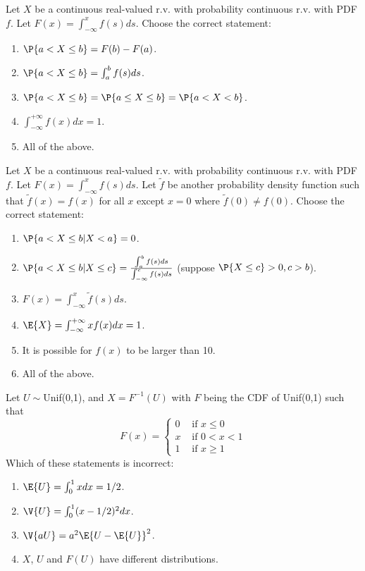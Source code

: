 \documentclass[poll_tutorial_format]{subfiles}
\begin{document}
	

	\begin{exercise}
		Let $X$ be a continuous real-valued r.v. with probability continuous r.v. with PDF $f$. Let $F(x)=\int_{-\infty}^x f(s)ds$. 
		Choose the correct statement:
		\begin{enumerate}
			\item $\P{a< X\leq b} =F(b)-F(a)$.
			\item $\P{a< X\leq b} =\int_{a}^b f(s)ds$.
			\item $\P{a< X\leq b}=\P{a\leq  X\leq b}=\P{a< X< b}$.
			\item $\int_{-\infty}^{+\infty} f(x)dx=1$.
			\item All of the above. 
		\end{enumerate}
	\end{exercise}
	
	
	
	\begin{exercise}
	Let $X$ be a continuous real-valued r.v. with probability continuous r.v. with PDF $f$. Let $F(x)=\int_{-\infty}^x f(s)ds$. Let $\tilde{f}$ be another probability density function such that  $\tilde{f}(x)=f(x)$ for all $x$ except $x=0$ where $\tilde{f}(0)\neq {f}(0)$.
	Choose the correct statement:
	\begin{enumerate}
		\item $\P{a< X\leq b|X<a} =0$.
		\item $\P{a< X\leq b|X\leq c} =\frac{\int_{a}^b f(s)ds}{\int_{-\infty}^c f(s)ds}$ (suppose $\P{X\leq c} >0, c>b$).
		\item $F(x)=\int_{-\infty}^x \tilde{f}(s)ds$.
		\item $\E{X}= \int_{-\infty}^{+\infty} xf(x)dx=1$.
		\item It is possible for $f(x)$ to be larger than 10.
		\item All of the above. 
	\end{enumerate}
\end{exercise}

	
	
	\begin{exercise}
	Let $U\sim $Unif(0,1), and $X=F^{-1}(U)$ with $F$ being the CDF of Unif(0,1) such that 
	$$F(x)= \begin{cases}0 & \text { if } x \leq 0 \\ x & \text { if } 0<x<1 \\ 1 & \text { if } x \geq 1\end{cases} $$
	Which of these statements is incorrect:
	\begin{enumerate}
		\item $\E{U}=\int_{0}^{1}xdx=1/2$.
		\item $\V{U}=\int_{0}^{1}(x-1/2)^2dx$.
		\item $\V{aU}=a^2\E{U-\E{U}}^2$.
		\item $X$, $U$ and $F(U)$ have different distributions. 
	\end{enumerate}
\end{exercise}
\end{document}
